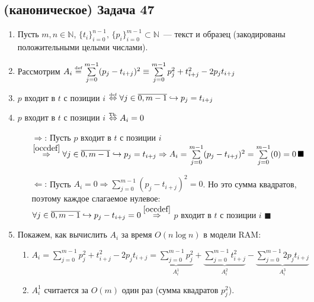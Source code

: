 \documentclass[a4paper]{article}
\def\eqdef{\overset{\mbox{\tiny def}}{=}}
\newcommand{\NN}{\mathbb{N}}
\begin{document}
\subsection*{(каноническое) Задача 47}
\begin{enumerate}
\item Пусть $m,n\in\NN$, $\{t_i\}_{i=0}^{n-1},\,\{p_i\}_{i=0}^{m-1}\subset \NN$~--- текст и образец (закодированы положительными целыми числами).
\item Рассмотрим $A_i\eqdef\sum\limits_{j=0}^{m-1}(p_j-t_{i+j})^2\equiv\sum\limits_{j=0}^{m-1}p_j^2+t_{i+j}^2-2p_jt_{i+j}$
\item \label{occdef} $p$ входит в $t$ с позиции $i$ $\overset{\mbox{\tiny def}}{\Leftrightarrow} \forall j\in\overline{0,m-1}\hookrightarrow p_j=t_{i+j}$
\item $p$ входит в $t$ с позиции $i$ $\overset{\mbox{\tiny Th.}}{\Leftrightarrow} A_i=0$\begin{enumerate}
\item [$\Rightarrow$:] Пусть $p$ входит в $t$ с позиции $i$ $\overset{\ref{occdef}}{\Rightarrow}\forall j\in\overline{0,m-1}\hookrightarrow p_j=t_{i+j}\Rightarrow A_i=\sum\limits_{j=0}^{m-1}(p_j-t_{i+j})^2=\sum\limits_{j=0}^{m-1}(0)=0\,\blacksquare$
\item [$\Leftarrow$:] Пусть $A_i=0\Rightarrow\sum\limits_{j=0}^{m-1}(p_j-t_{i+j})^2=0$. Но это сумма квадратов, поэтому каждое слагаемое нулевое: $\forall j\in\overline{0,m-1}\hookrightarrow p_j-t_{i+j}=0\overset{\ref{occdef}}{\Rightarrow}$ $p$ входит в $t$ с позиции $i$ $\blacksquare$
\end{enumerate}
\item Покажем, как вычислить $A_i$ за время $O(n\log n)$ в модели RAM:\begin{enumerate}
\item $A_i=\sum\limits_{j=0}^{m-1}p_j^2+t_{i+j}^2-2p_jt_{i+j}=\underbrace{\sum\limits_{j=0}^{m-1}p_j^2}_{A_i^1}+\underbrace{\sum\limits_{j=0}^{m-1}t_{i+j}^2}_{A_i^2}-\underbrace{\sum\limits_{j=0}^{m-1}2p_jt_{i+j}}_{A_i^3}$
\item $A_i^1$ считается за $O(m)$ один раз (сумма квадратов $p_j^2$).
\end{enumerate}
\end{enumerate}
\end{document}
